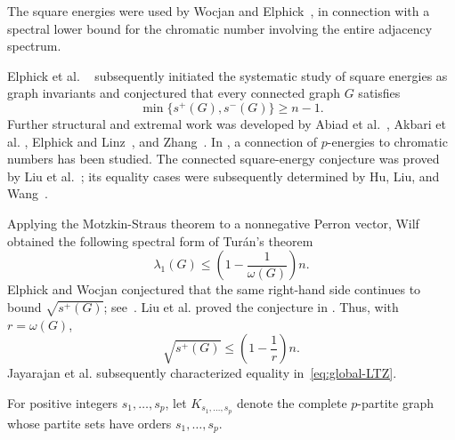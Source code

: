 \documentclass[11pt]{article}
\numberwithin{equation}{section}
\theoremstyle{definition}
\theoremstyle{remark}
\newcommand{\splus}{s^{+}}
\newcommand{\sminus}{s^{-}}
\begin{document}
	
	The square energies were used by Wocjan and
	Elphick~\cite{MR3104537}, in connection with a spectral lower
	bound for the chromatic number involving the entire adjacency spectrum.
	
	Elphick et al. ~\cite{MR3512335} subsequently initiated the systematic study of
	square energies as graph invariants and conjectured that every connected
	graph $G$ satisfies
	\[
	\min\{\splus(G),\sminus(G)\}\geq n -1.
	\]
	Further structural and extremal work was developed by Abiad et
	al.~\cite{MR4626652}, Akbari et al. \cite{MR4961868, akbari2025refinement}, Elphick and Linz~\cite{MR4755798}, and
	Zhang~\cite{zhang2024extremal}. In \cite{MR4971662}, a connection of $p$-energies to chromatic numbers has been studied. The connected square-energy conjecture was
	proved by Liu et al.~\cite{liu2026positive2}; its equality cases
	were subsequently determined by Hu, Liu, and Wang~\cite{hu2026extremal}.
	
	
	Applying the Motzkin-Straus \cite{MR175813} theorem to a nonnegative Perron
	vector, Wilf \cite{MR830598} obtained the following spectral form of Tur\'an's theorem
	\[
	\lambda_1(G)\leq
	\left(1-\frac1{\omega(G)}\right)n.
	\]
	Elphick and Wocjan conjectured that the same right-hand side continues to
	bound $\sqrt{\splus(G)}$; see~\cite{MR4682534, elphick2018conjecturedlowerboundclique}.
	Liu et al. proved the conjecture in \cite{liu2026positive}. Thus, with $r=\omega(G)$,
	\begin{equation}\label{eq:global-LTZ}
		\sqrt{\splus(G)}
		\leq
		\left(1-\frac1r\right)n.
	\end{equation}
	Jayarajan et al.\cite{jayarajan2026equalitycasepositivesquareenergy} subsequently characterized equality
	in~\eqref{eq:global-LTZ}. 
	
	For positive integers $s_1,\ldots,s_p$, let
	$K_{s_1,\ldots,s_p}$ denote the complete $p$-partite graph
	whose partite sets have orders $s_1,\ldots,s_p$.
	
\end{document}

